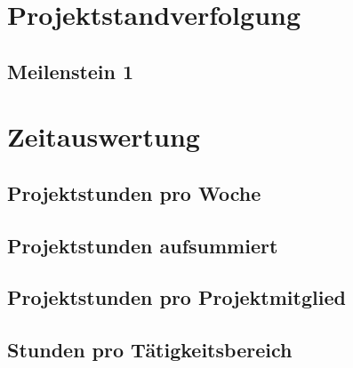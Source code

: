 
\section{Projektstandverfolgung}

\subsection{Meilenstein 1}

\section{Zeitauswertung}

\subsection{Projektstunden pro Woche}

\subsection{Projektstunden aufsummiert}

\subsection{Projektstunden pro Projektmitglied}

\subsection{Stunden pro Tätigkeitsbereich}
